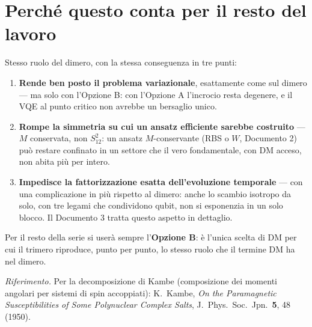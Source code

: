 \documentclass[11pt,a4paper]{article}
\begin{document}


\section{Perché questo conta per il resto del lavoro}

Stesso ruolo del dimero, con la stessa conseguenza in tre punti:

\begin{enumerate}[leftmargin=1.5em,itemsep=4pt]
\item \textbf{Rende ben posto il problema variazionale}, esattamente come sul
dimero --- ma solo con l'Opzione B: con l'Opzione A l'incrocio resta
degenere, e il VQE al punto critico non avrebbe un bersaglio unico.
\item \textbf{Rompe la simmetria su cui un ansatz efficiente sarebbe
costruito} --- $M$ conservata, non $S_{12}^2$: un ansatz $M$-conservante
(RBS o $W$, Documento 2) può restare confinato in un settore che il vero
fondamentale, con DM acceso, non abita più per intero.
\item \textbf{Impedisce la fattorizzazione esatta dell'evoluzione
temporale} --- con una complicazione in più rispetto al dimero: anche lo
scambio isotropo da solo, con tre legami che condividono qubit, non si
esponenzia in un solo blocco. Il Documento 3 tratta questo aspetto in
dettaglio.
\end{enumerate}

Per il resto della serie si userà sempre l'\textbf{Opzione B}: è l'unica
scelta di DM per cui il trimero riproduce, punto per punto, lo stesso ruolo
che il termine DM ha nel dimero.

\bigskip
\noindent\footnotesize\textit{Riferimento.} Per la decomposizione di Kambe
(composizione dei momenti angolari per sistemi di spin accoppiati): K.~Kambe,
\emph{On the Paramagnetic Susceptibilities of Some Polynuclear Complex
Salts}, J.\ Phys.\ Soc.\ Jpn.\ \textbf{5}, 48 (1950).
\end{document}
